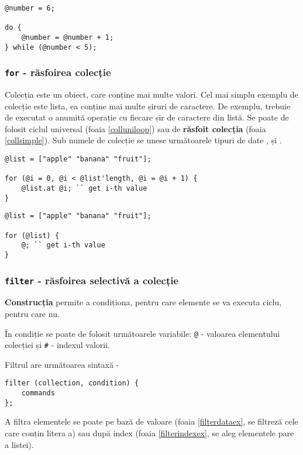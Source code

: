 \begin{lstlisting}[caption=Ciclu do while, label=dowhileex]
@number = 6;

do {
	@number = @number + 1;
} while (@number < 5);
\end{lstlisting}

\subsubsection{\lstinline`for` - răsfoirea colecție}

{Colecția} este un obiect, care conține mai multe valori. Cel mai simplu exemplu de colecție este lista, ea conține mai multe șiruri de caractere. De exemplu, trebuie de executat o anumită operație cu fiecare șir de caractere din listă. Se poate de folosit ciclul universal (foaia \ref{colluniloop}) sau de {\bf răsfoit colecția} (foaia \ref{collsimple}). Sub numele de colecție se unesc următoarele tipuri de date ,  și .
\begin{lstlisting}[caption=Răsfoirea colecție prin ciclu universal, label=colluniloop]
@list = ["apple" "banana" "fruit"];

for (@i = 0, @i < @list'length, @i = @i + 1) {
	@list.at @i; `` get i-th value
}
\end{lstlisting}

\begin{lstlisting}[caption=Răsfoirea simplificată a colecției, label=collsimple]
@list = ["apple" "banana" "fruit"];

for (@list) {
	@; `` get i-th value
}
\end{lstlisting}

\subsubsection{\lstinline`filter` - răsfoirea selectivă a colecție}

{\bf Construcția } permite a condiționa, pentru care elemente se va executa ciclu, pentru care nu.

În condiție se poate de folosit următoarele variabile: \lstinline|@| - valoarea elementului colecției și \lstinline|#| - indexul valorii.

Filtrul are următoarea sintaxă -
\begin{lstlisting}[numbers=none]
filter (collection, condition) {
	commands
};
\end{lstlisting}

A filtra elementele se poate pe bază de valoare (foaia \ref{filterdataex}, se filtreză cele care conțin litera a) sau după index (foaia \ref{filterindexex}, se aleg elementele pare a listei).

